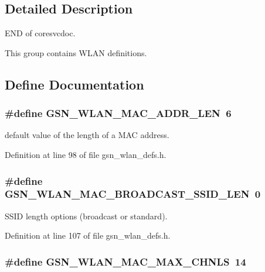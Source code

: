 \subsection{Detailed Description}
END of coresvcdoc.

This group contains WLAN definitions. 

\subsection{Define Documentation}
\hypertarget{a00641_gab875910eb7b2ccc2d9d632ad20f6564c}{
\subsubsection[{GSN\_\-WLAN\_\-MAC\_\-ADDR\_\-LEN}]{\setlength{\rightskip}{0pt plus 5cm}\#define GSN\_\-WLAN\_\-MAC\_\-ADDR\_\-LEN~6}}
\label{a00641_gab875910eb7b2ccc2d9d632ad20f6564c}


default value of the length of a MAC address. 



Definition at line 98 of file gsn\_\-wlan\_\-defs.h.

\hypertarget{a00641_gabe983e40f4fad264d1750aa6c4bcfcac}{
\subsubsection[{GSN\_\-WLAN\_\-MAC\_\-BROADCAST\_\-SSID\_\-LEN}]{\setlength{\rightskip}{0pt plus 5cm}\#define GSN\_\-WLAN\_\-MAC\_\-BROADCAST\_\-SSID\_\-LEN~0}}
\label{a00641_gabe983e40f4fad264d1750aa6c4bcfcac}


SSID length options (broadcast or standard). 



Definition at line 107 of file gsn\_\-wlan\_\-defs.h.

\hypertarget{a00641_ga81f65ed973227d85ed9048e0047663da}{
\subsubsection[{GSN\_\-WLAN\_\-MAC\_\-MAX\_\-CHNLS}]{\setlength{\rightskip}{0pt plus 5cm}\#define GSN\_\-WLAN\_\-MAC\_\-MAX\_\-CHNLS~14}}
\label{a00641_ga81f65ed973227d85ed9048e0047663da}



